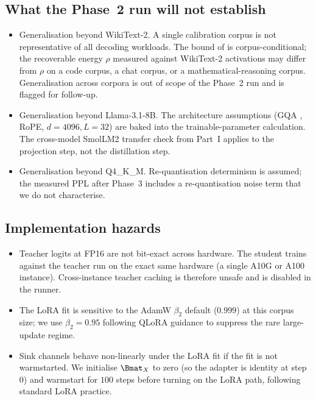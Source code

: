 \documentclass[11pt]{article}
\begin{document}
\subsection{What the Phase~2 run will not establish}
\begin{itemize}
\item Generalisation beyond WikiText-2. A single calibration corpus is
      not representative of all decoding workloads. The bound of
       is corpus-conditional; the recoverable energy
      $\rho$ measured against WikiText-2 activations may differ from
      $\rho$ on a code corpus, a chat corpus, or a mathematical-reasoning
      corpus. Generalisation across corpora is out of scope of the
      Phase~2 run and is flagged for follow-up.
\item Generalisation beyond Llama-3.1-8B. The architecture
      assumptions (GQA \cite{ainslie2023gqa}, RoPE, $d{=}4096, L{=}32$)
      are baked into the trainable-parameter calculation. The
      cross-model SmolLM2 transfer check from Part~I applies to the
      projection step, not the distillation step.
\item Generalisation beyond Q4\_K\_M. Re-quantisation determinism is
      assumed; the measured PPL after Phase~3 includes a
      re-quantisation noise term that we do not characterise.
\end{itemize}

\subsection{Implementation hazards}
\begin{itemize}
\item Teacher logits at FP16 are not bit-exact across hardware. The
      student trains against the teacher run on the exact same hardware
      (a single A10G or A100 instance). Cross-instance teacher caching
      is therefore unsafe and is disabled in the runner.
\item The LoRA fit is sensitive to the AdamW $\beta_2$ default
      ($0.999$) at this corpus size; we use $\beta_2{=}0.95$ following
      QLoRA \cite{dettmers2023qlora} guidance to suppress the rare
      large-update regime.
\item Sink channels behave non-linearly under the LoRA fit if the
      fit is not warmstarted. We initialise $\Bmat_X$ to zero (so the
      adapter is identity at step $0$) and warmstart for $100$ steps
      before turning on the LoRA path, following standard LoRA
      practice.
\end{itemize}
\end{document}
